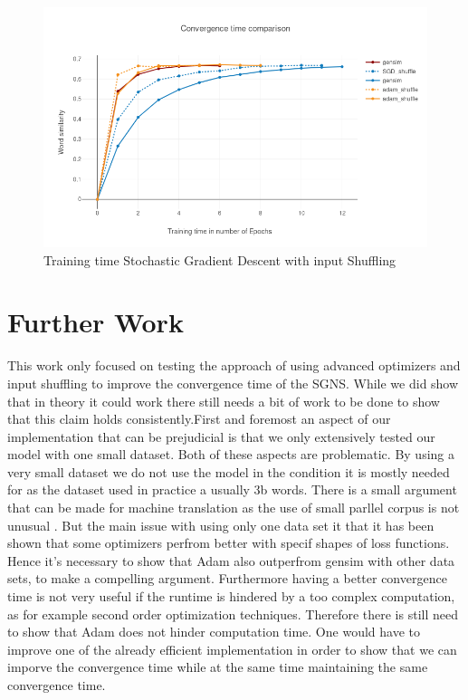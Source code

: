 \begin{figure}[H]
    \centering
			\includegraphics[scale=0.45]{images/gensim_vs_adam} 
    \caption{Training time Stochastic Gradient Descent with input Shuffling}
    \label{fig:gensim_vs_adam}
\end{figure}


\section{Further Work}
This work only focused on testing the approach of using advanced optimizers and input shuffling to improve the convergence time of the SGNS. While we did show that in theory it could work there still needs a bit of work to be done to show that this claim holds consistently.First and foremost an aspect of our implementation that can be prejudicial is that we only extensively tested our model with one small dataset. Both of these aspects are problematic. By using a very small dataset we do not use the model in the condition it is mostly needed for as the dataset used in practice a usually 3b words. There is a small argument that can be made for machine translation as the use of small parllel corpus is not unusual . But the main issue with using only one data set it that it has been shown that some optimizers perfrom better with specif shapes of loss functions. Hence it's necessary to show that Adam also outperfrom gensim with other data sets, to make a compelling argument. 
Furthermore having a better convergence time is not very useful if the runtime is hindered by a too complex computation, as for example second order optimization techniques. Therefore there is still need to show that Adam does not hinder computation time.  One would have to improve one of the already efficient implementation in order to show that we can imporve the convergence time while at the same time maintaining the same convergence time.



